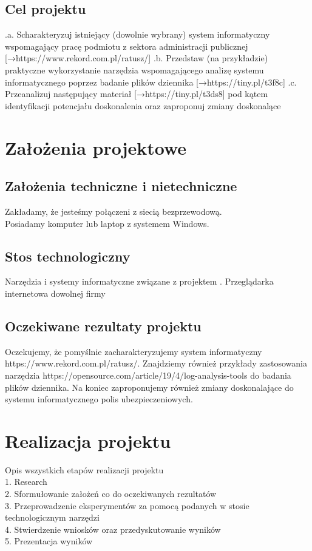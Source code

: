 \documentclass[12pt,a4paper]{article}
\begin{document}
\subsection{Cel projektu}
.a.  Scharakteryzuj istniejący (dowolnie wybrany) system informatyczny wspomagający pracę podmiotu z sektora administracji publicznej [→https://www.rekord.com.pl/ratusz/]
.b. Przedstaw (na przykładzie) praktyczne wykorzystanie narzędzia wspomagającego analizę systemu informatycznego poprzez badanie plików dziennika [→https://tiny.pl/t3f8c]
.c. Przeanalizuj następujący materiał [→https://tiny.pl/t3ds8] pod kątem identyfikacji potencjału doskonalenia oraz zaproponuj zmiany doskonalące
\newpage

\section{Założenia projektowe}

\subsection{Założenia techniczne i nietechniczne}
Zakładamy, że jesteśmy połączeni z siecią bezprzewodową. \\
Posiadamy komputer lub laptop z systemem Windows.

\subsection{Stos technologiczny}
Narzędzia i systemy informatyczne związane z projektem . Przeglądarka internetowa dowolnej firmy
\newline

\subsection{Oczekiwane rezultaty projektu}
Oczekujemy, że pomyślnie zacharakteryzujemy system informatyczny https://www.rekord.com.pl/ratusz/. \newline
Znajdziemy również przykłady zastosowania narzędzia https://opensource.com/article/19/4/log-analysis-tools do badania plików dziennika. \newline Na koniec zaproponujemy również zmiany doskonalające do systemu informatycznego polis ubezpieczeniowych.
\newpage
\section{Realizacja projektu}
Opis wszystkich etapów realizacji projektu \\
1. Research \\
2. Sformułowanie założeń co do oczekiwanych rezultatów \\
3. Przeprowadzenie eksperymentów za pomocą podanych w stosie technologicznym narzędzi \\
4. Stwierdzenie wniosków oraz przedyskutowanie wyników \\
5. Prezentacja wyników \\
\newpage
\end{document}
